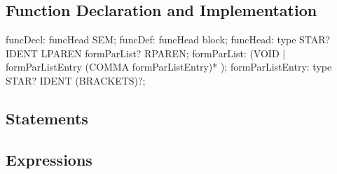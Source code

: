 \subsection{Function Declaration and Implementation}

\begin{AntlrCode}[float,numbers=none,caption=Function declaration and defintion of the MiniC++ ANTLR grammar., label=lst:ANTLRMiniCppFuncDeclDef]
funcDecl:         funcHead SEM;
funcDef:          funcHead block;
funcHead:         type STAR? IDENT LPAREN formParList? RPAREN;
formParList:      (VOID
                  |     formParListEntry
                   (COMMA formParListEntry)*
                  );
formParListEntry: type STAR? IDENT (BRACKETS)?;
\end{AntlrCode}


\subsection{Statements}

\subsection{Expressions}